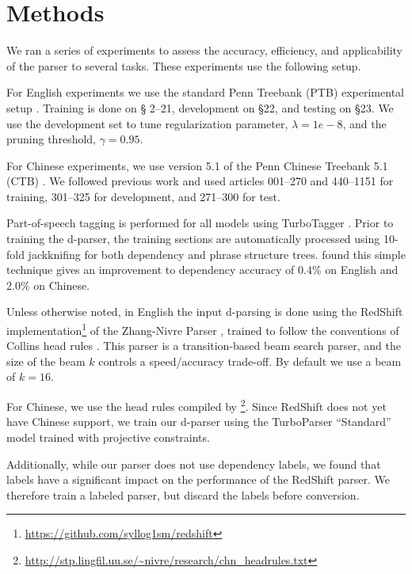\documentclass[11pt,letterpaper]{article}
\newcommand{\lpkcomment}[1]{\textcolor{red}{\bf \small [#1 --lpk]}}
\begin{document}
\section{Methods}

We ran a series of experiments to assess the accuracy, efficiency,
and applicability of the parser to several tasks. These experiments
use the following setup.  

For English experiments we use the standard Penn Treebank (PTB)
experimental setup \cite{marcus1993building}. Training is done on \S
2--21, development on \S 22, and testing on \S 23. We use the development set 
to tune 
regularization parameter, $\lambda=1e-8$, and the pruning threshold, $\gamma=0.95$.


For Chinese experiments, we use version 5.1 of the Penn  Chinese Treebank 5.1 (CTB) \cite{xue2005penn}. We followed previous work and used
articles 001--270 and 440--1151 for training, 
301--325 for development, and 
271--300 for test.

Part-of-speech tagging is performed for all models using TurboTagger
\cite{martins2013turning}.  Prior to training the d-parser, the
training sections are automatically processed using 10-fold
jackknifing \cite{collins2000} for both dependency and phrase
structure trees.  found this simple technique
gives an improvement to dependency accuracy of 0.4\% on English and
2.0\% on Chinese.

Unless otherwise noted, in English the input d-parsing is done using the RedShift
implementation\footnote{\url{https://github.com/syllog1sm/redshift}}
of the Zhang-Nivre Parser \cite{zhang2011transition}, trained to
follow the conventions of Collins head rules
\cite{collins2003head}. This parser is a transition-based beam search
parser, and the size of the beam $k$ controls a speed/accuracy trade-off.
By default we use a beam of $k=16$. 

For Chinese, we use the head rules compiled by
\footnote{\url{http://stp.lingfil.uu.se/~nivre/research/chn_headrules.txt}}. Since
RedShift does not yet have Chinese support, we train our d-parser
using the TurboParser ``Standard'' model trained with projective constraints.


Additionally, while our parser does not use dependency labels, 
we found that labels have a significant impact on the performance of
the RedShift parser. We therefore train a labeled parser, but 
discard the labels before conversion.
\end{document}
